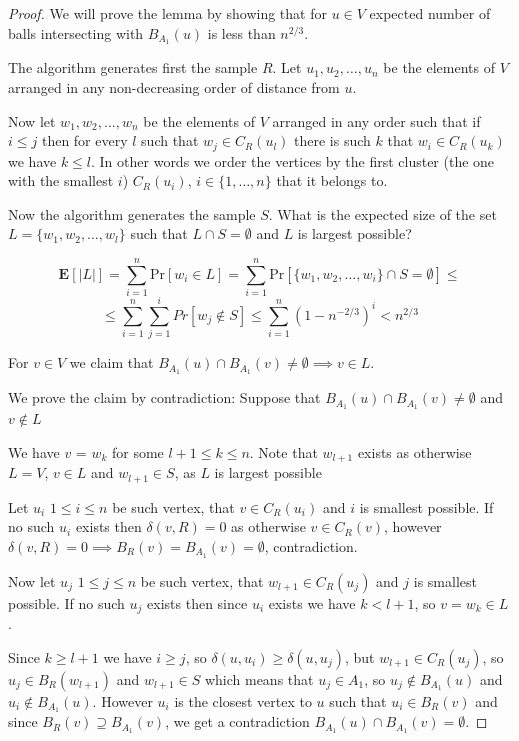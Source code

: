 \documentclass[shortabstract, lic, english]{iithesis}
\theoremstyle{definition} \newtheorem{definition}{Definition}[chapter]
\theoremstyle{plain} \newtheorem{remark}[definition]{Observation}
\theoremstyle{plain} \newtheorem{theorem}[definition]{Theorem}
\theoremstyle{plain} \newtheorem{lemma}[definition]{Lemma}
\theoremstyle{plain} \newtheorem{conjecture}[definition]{Conjecture}
\begin{document}
\begin{proof}
    We will prove the lemma by showing that for $u \in V$ expected number of balls intersecting with $B_{A_1}(u)$ is less than $n^{2/3}$.

    The algorithm generates first the sample $R$.
    Let $u_1, u_2, \ldots, u_n$ be the elements of $V$ arranged in any non-decreasing order of distance from $u$.

    Now let $w_1, w_2, \ldots, w_n$ be the elements of $V$ arranged in any order such that if $i \leq j$ then 
    for every $l$ such that $w_j \in C_R(u_l)$ there is such $k$ that $w_i \in C_R(u_k)$ we have $k \leq l$.
    In other words we order the vertices by the first cluster (the one with the smallest $i$) $C_R(u_i)$, $i \in \{1, \ldots, n\}$ that it belongs to.

    Now the algorithm generates the sample $S$. What is the expected size of the set $L = \{w_1, w_2, \ldots, w_l\}$ such that $L \cap S = \emptyset$ and $L$ is largest possible?

    $$\mathbf{E}[|L|] = \sum_{i=1}^{n} \text{Pr}[w_i \in L] =\sum_{i=1}^{n} \text{Pr}[\{w_1, w_2, \ldots, w_i\} \cap S = \emptyset] \leq $$
    $$\leq \sum_{i=1}^{n} \sum_{j=1}^{i} Pr[w_j \notin S] \leq \sum_{i=1}^{n} (1 - n^{-2/3})^i < n^{2/3}$$

    For $v \in V$ we claim that $B_{A_1}(u) \cap B_{A_1}(v) \neq \emptyset \implies v \in L$.

    We prove the claim by contradiction: Suppose that $B_{A_1}(u) \cap B_{A_1}(v) \neq \emptyset$ and $v \notin L$

    We have $v$ = $w_k$ for some $l + 1 \leq k \leq n$. 
    Note that $w_{l+1}$ exists as otherwise $L = V$, $v \in L$ and $w_{l+1} \in S$, as $L$ is largest possible 
    
    Let $u_i$ $1 \leq i \leq n$ be such vertex, that $v \in C_R(u_i)$ and $i$ is smallest possible.
    If no such $u_i$ exists then $\delta(v, R) = 0$ as otherwise $v \in C_R(v)$, however $\delta(v, R) = 0 \implies B_R(v) = B_{A_1}(v) = \emptyset$, contradiction.

    Now let $u_j$ $1 \leq j \leq n$ be such vertex, that $w_{l+1} \in C_R(u_j)$ and $j$ is smallest possible. 
    If no such $u_j$ exists then since $u_i$ exists we have $k < l + 1$, so $v = w_k \in L$.

    Since $k \geq l + 1$ we have $i \geq j$, so $\delta(u, u_i) \geq \delta(u, u_j)$, but $w_{l+1} \in C_R(u_j)$, so $u_j \in B_R(w_{l+1})$ and $w_{l+1} \in S$
    which means that $u_j \in A_1$, so $u_j \notin B_{A_1}(u)$ and $u_i \notin B_{A_1}(u)$.
    However $u_i$ is the closest vertex to $u$ such that $u_i \in B_R(v)$ and since $B_R(v) \supseteq B_{A_1}(v)$, 
    we get a contradiction $B_{A_1}(u) \cap B_{A_1}(v) = \emptyset$.
\end{proof}
\end{document}
